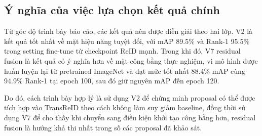 \subsection{Ý nghĩa của việc lựa chọn kết quả chính}

Từ góc độ trình bày báo cáo, các kết quả nên được diễn giải theo hai lớp. V2 là kết quả tốt nhất về mặt hiệu năng tuyệt đối, với mAP 89.5\% và Rank-1 95.5\% trong setting fine-tune từ checkpoint ReID mạnh. Trong khi đó, V7 residual fusion là kết quả có ý nghĩa hơn về mặt công bằng thực nghiệm, vì mô hình được huấn luyện lại từ pretrained ImageNet và đạt mức tốt nhất 88.4\% mAP cùng 94.9\% Rank-1 tại epoch 100, sau đó giữ nguyên mAP đến epoch 120.

Do đó, cách trình bày hợp lý là sử dụng V2 để chứng minh proposal có thể được tích hợp vào TransReID theo cách không làm suy giảm baseline, đồng thời sử dụng V7 để cho thấy khi chuyển sang điều kiện khởi tạo công bằng hơn, residual fusion là hướng khả thi nhất trong số các proposal đã khảo sát.

